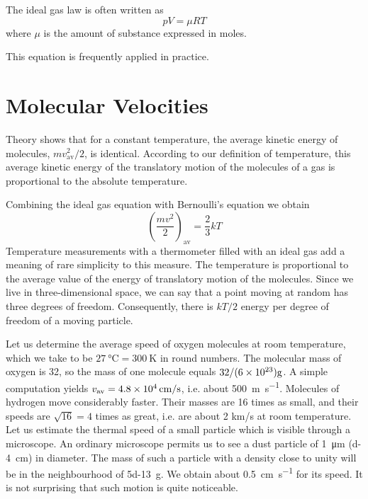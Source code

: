 The ideal gas law is often written as
\begin{equation*}%
pV = \mu RT
\end{equation*}
where $\mu$ is the amount of substance expressed in moles.

This equation is frequently applied in practice.

\section{Molecular Velocities}

Theory shows that for a constant temperature, the aver­age kinetic energy of molecules, $mv^{2}_{\textrm{av}}/2$, is identical. Ac­cording to our definition of temperature, this average kinetic energy of the translatory motion of the molecules of a gas is proportional to the absolute temperature.

Combining the ideal gas equation with Bernoulli’s equation we obtain 
\begin{equation*}%
\left( \frac{mv^{2}}{2} \right)_{\textrm{av}} = \frac{2}{3} kT
\end{equation*}
Temperature measurements with a thermometer filled with an ideal gas add a meaning of rare simplicity to this measure. The temperature is proportional to the average value of the energy of translatory motion of the mole­cules. Since we live in three-dimensional space, we can say that a point moving at random has three degrees of freedom. Consequently, there is $kT/2$ energy per degree of freedom of a moving particle.

Let us determine the average speed of oxygen mole­cules at room temperature, which we take to be $\SI{27}{\celsius} = \SI{300}{\kelvin}$ in round numbers. The molecular mass of oxygen is 32, so the mass of one molecule equals $32/(\num{6d23})\si{\gram}$. A simple computation yields $v_{\textrm{av}} = \SI{4.8d4}{\centi\meter\per\second}$, i.e. about \SI{500}{\meter\per\second}. Molecules of hydrogen move considerably faster. Their masses are 16 times as small, and their speeds are $\sqrt{16} = 4$ times as great, i.e. are about 2 km/s at room temperature. Let us estimate the thermal speed of a small particle which is visible through a microscope. An ordinary microscope permits us to see a dust particle of \SI{1}{\micro\meter} (\SI{d-4}{\centi\meter}) in diameter. The mass of such a particle with a density close to unity will be in the neighbourhood of \SI{5d-13}{\gram}. We obtain about  \SI{0.5}{\centi\meter\per\second} for its speed. It is not surprising that such motion is quite noticeable.


